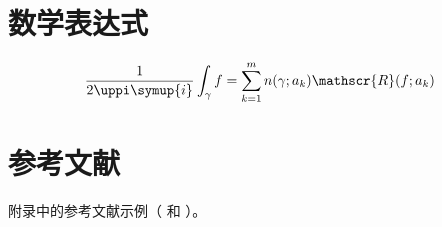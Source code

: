 \section{数学表达式}

\begin{equation}
  \frac{1}{2 \uppi \symup{i}} \int_\gamma f = \sum_{k=1}^m n(\gamma; a_k) \mathscr{R}(f; a_k)
  \label{eq:appendix-equation}
\end{equation}

\section{参考文献}

附录中的参考文献示例（\cite{carlson1981two} 和 \cite{carlson1981two,taylor1983scanning,taylor1981study}）。

